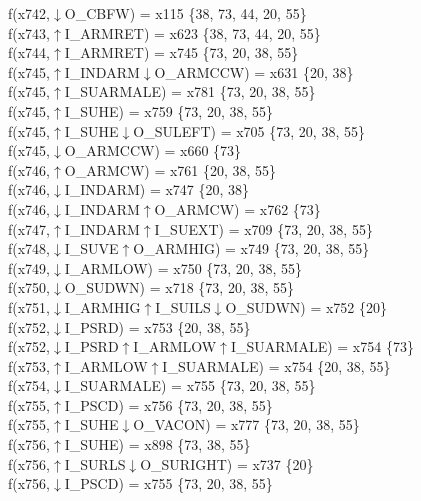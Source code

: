 f(x742,$\downarrow$O\_CBFW) = x115 \{38, 73, 44, 20, 55\} \\  
f(x743,$\uparrow$I\_ARMRET) = x623 \{38, 73, 44, 20, 55\} \\  
f(x744,$\uparrow$I\_ARMRET) = x745 \{73, 20, 38, 55\} \\  
f(x745,$\uparrow$I\_INDARM$\downarrow$O\_ARMCCW) = x631 \{20, 38\} \\  
f(x745,$\uparrow$I\_SUARMALE) = x781 \{73, 20, 38, 55\} \\  
f(x745,$\uparrow$I\_SUHE) = x759 \{73, 20, 38, 55\} \\  
f(x745,$\uparrow$I\_SUHE$\downarrow$O\_SULEFT) = x705 \{73, 20, 38, 55\} \\  
f(x745,$\downarrow$O\_ARMCCW) = x660 \{73\} \\  
f(x746,$\uparrow$O\_ARMCW) = x761 \{20, 38, 55\} \\  
f(x746,$\downarrow$I\_INDARM) = x747 \{20, 38\} \\  
f(x746,$\downarrow$I\_INDARM$\uparrow$O\_ARMCW) = x762 \{73\} \\  
f(x747,$\uparrow$I\_INDARM$\uparrow$I\_SUEXT) = x709 \{73, 20, 38, 55\} \\  
f(x748,$\downarrow$I\_SUVE$\uparrow$O\_ARMHIG) = x749 \{73, 20, 38, 55\} \\  
f(x749,$\downarrow$I\_ARMLOW) = x750 \{73, 20, 38, 55\} \\  
f(x750,$\downarrow$O\_SUDWN) = x718 \{73, 20, 38, 55\} \\  
f(x751,$\downarrow$I\_ARMHIG$\uparrow$I\_SUILS$\downarrow$O\_SUDWN) = x752 \{20\} \\  
f(x752,$\downarrow$I\_PSRD) = x753 \{20, 38, 55\} \\  
f(x752,$\downarrow$I\_PSRD$\uparrow$I\_ARMLOW$\uparrow$I\_SUARMALE) = x754 \{73\} \\  
f(x753,$\uparrow$I\_ARMLOW$\uparrow$I\_SUARMALE) = x754 \{20, 38, 55\} \\  
f(x754,$\downarrow$I\_SUARMALE) = x755 \{73, 20, 38, 55\} \\  
f(x755,$\uparrow$I\_PSCD) = x756 \{73, 20, 38, 55\} \\  
f(x755,$\uparrow$I\_SUHE$\downarrow$O\_VACON) = x777 \{73, 20, 38, 55\} \\  
f(x756,$\uparrow$I\_SUHE) = x898 \{73, 38, 55\} \\  
f(x756,$\uparrow$I\_SURLS$\downarrow$O\_SURIGHT) = x737 \{20\} \\  
f(x756,$\downarrow$I\_PSCD) = x755 \{73, 20, 38, 55\} \\  
